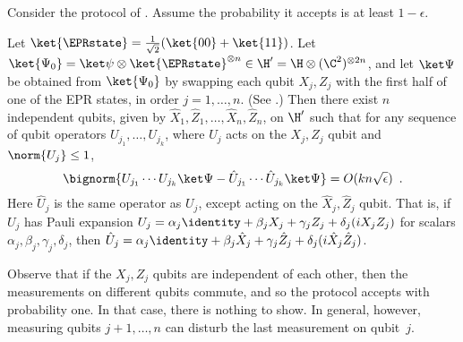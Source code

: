 \documentclass[11pt]{article}
\begin{document}
\begin{theorem} \label{t:statedependentnqubitprotocol}
Consider the protocol of .  Assume the probability it accepts is at least $1 - \epsilon$.  

Let $\ket{\EPRstate} = \tfrac{1}{\sqrt 2}(\ket{00} + \ket{11})$.  Let $\ket{\Psi_0} = \ket \psi \otimes \ket{\EPRstate}^{\otimes n} \in \H' = \H \otimes (\C^2)^{\otimes 2 n}$, and let $\ket \Psi$ be obtained from $\ket{\Psi_0}$ by swapping each qubit $X_j, Z_j$ with the first half of one of the EPR states, in order $j = 1, \ldots, n$.  (See .)  Then there exist $n$ independent qubits, given by $\hat X_1, \hat Z_1, \ldots, \hat X_n, \hat Z_n$, on $\H'$ such that for any sequence of qubit operators $U_{j_1}, \ldots, U_{j_k}$, where $U_j$ acts on the $X_j, Z_j$ qubit and $\norm{U_j} \leq 1$, 
\begin{equation} \label{e:statedependentnqubitprotocol}
\bignorm{ U_{j_1} \cdots U_{j_k} \ket \Psi - \hat U_{j_1} \cdots \hat U_{j_k} \ket \Psi } = O(k n \sqrt \epsilon)
 \enspace .
\end{equation}
Here $\hat U_j$ is the same operator as $U_j$, except acting on the $\hat X_j, \hat Z_j$ qubit.  That is, if $U_j$ has Pauli expansion $U_j = \alpha_j \identity + \beta_j X_j + \gamma_j Z_j + \delta_j (i X_j Z_j)$ for scalars $\alpha_j, \beta_j, \gamma_j, \delta_j$, then $\hat U_j = \alpha_j \identity + \beta_j \hat X_j + \gamma_j \hat Z_j + \delta_j (i \hat X_j \hat Z_j)$.  
\end{theorem}
 
Observe that if the $X_j, Z_j$ qubits are independent of each other, then the measurements on different qubits commute, and so the protocol accepts with probability one.  In that case, there is nothing to show.  In general, however, measuring qubits $j+1, \ldots, n$ can disturb the last measurement on qubit~$j$.  
\end{document}
